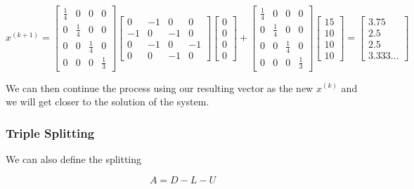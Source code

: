 \[
    x^{(k + 1)} = 
    \begin{bmatrix}
        \frac{1}{4} & 0 & 0 & 0 \\ 
        0 & \frac{1}{4} & 0 & 0 \\ 
        0 & 0 & \frac{1}{4} & 0 \\
        0 & 0 & 0 & \frac{1}{3} 
    \end{bmatrix}
    \begin{bmatrix}
        0 & -1 & 0 & 0 \\ 
        -1 & 0 & -1 & 0 \\ 
        0 & -1 & 0 & -1 \\ 
        0 & 0 & -1 & 0
    \end{bmatrix}
    \begin{bmatrix}
       0 \\ 
       0 \\ 
        0 \\
        0 
    \end{bmatrix}
    + 
    \begin{bmatrix}
       \frac{1}{4} & 0 & 0 & 0 \\ 
        0 & \frac{1}{4} & 0 & 0 \\ 
        0 & 0 & \frac{1}{4} & 0 \\
        0 & 0 & 0 & \frac{1}{3} 
    \end{bmatrix}
    \begin{bmatrix}
        15 \\ 
        10 \\ 
        10 \\ 
        10
    \end{bmatrix}
    = 
    \begin{bmatrix}
        3.75 \\ 
        2.5 \\ 
        2.5 \\ 
        3.333\ldots
    \end{bmatrix}
\]

We can then continue the process using our resulting vector as the new \(x^{(k)}\) and we will get closer to the solution of the system.

\subsubsection{Triple Splitting}

We can also define the splitting 

\[
    A = D - L - U
\]

